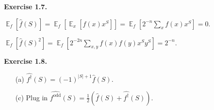 \documentclass[a4paper]{article}
\newenvironment{exercise}[1]{
	\par
	\noindent\textbf{Exercise #1.}\quad
}{
	\par
	\bigskip
}
\DeclareMathOperator{\E}{\mathbb E}
\newcommand{\pbra}[1]{{\left( #1 \right)}}
\newcommand{\sbra}[1]{{\left[ #1 \right]}}
\begin{document}
\begin{exercise}{1.7}
    $\E_f\sbra{\widehat f(S)}=\E_f\sbra{\E_x\sbra{f(x)x^S}}=\E_f\sbra{2^{-n}\sum_xf(x)x^S}=0$.

    $\E_f\sbra{\widehat f(S)^2}=\E_f\sbra{2^{-2n}\sum_{x,y}f(x)f(y)x^Sy^S}=2^{-n}$.
\end{exercise}

\begin{exercise}{1.8}
    \begin{itemize}
        \item[(a)] $\widehat{f^\dag}(S)=(-1)^{|S|+1}\widehat f(S)$.
        \item[(c)] Plug in $\widehat{f^\text{odd}}(S)=\frac12\pbra{\widehat f(S)+\widehat{f^\dag}(S)}$.
    \end{itemize}
\end{exercise}
\end{document}
